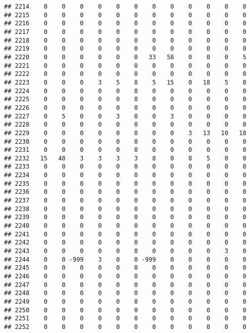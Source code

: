 \documentclass[]{article}
\begin{document}
\begin{verbatim}
## 2214    0    0    0    0    0    0    0    0    0    0    0    0
## 2215    0    0    0    0    0    0    0    0    0    0    0    0
## 2216    0    0    0    0    0    0    0    0    0    0    0    0
## 2217    0    0    0    0    0    0    0    0    0    0    0    0
## 2218    0    0    0    0    0    0    0    0    0    0    0    0
## 2219    0    0    0    0    0    0    0    0    0    0    0    0
## 2220    0    0    0    0    0    0   33   58    0    0    0    5
## 2221    0    0    0    0    0    0    0    0    0    0    0    0
## 2222    0    0    0    0    0    0    0    0    0    0    0    0
## 2223    0    0    0    3    5    8    5   15    0   18    5    0
## 2224    0    0    0    0    0    0    0    0    0    0    0    0
## 2225    0    0    0    0    0    0    0    0    0    0    0    0
## 2226    0    0    0    0    0    0    0    0    0    0    0    0
## 2227    0    5    0    0    3    0    0    3    0    0    0    0
## 2228    0    0    0    0    0    0    0    0    0    0    0    0
## 2229    0    0    0    0    0    0    0    0    3   13   10   18
## 2230    0    0    0    0    0    0    0    0    0    0    0    0
## 2231    0    0    0    0    0    0    0    0    0    0    0    0
## 2232   15   48    3    3    3    3    8    0    8    5    0    0
## 2233    0    0    0    0    0    0    0    0    0    0    0    0
## 2234    0    0    0    0    0    0    0    0    0    0    0    0
## 2235    0    0    0    0    0    0    0    0    0    0    0    0
## 2236    0    0    0    0    0    0    0    0    0    0    0    0
## 2237    0    0    0    0    0    0    0    0    0    0    0    0
## 2238    0    0    0    0    0    0    0    0    0    0    0    0
## 2239    0    0    0    0    0    0    0    0    0    0    0    0
## 2240    0    0    0    0    0    0    0    0    0    0    0    0
## 2241    0    0    0    0    0    0    0    0    0    0    0    0
## 2242    0    0    0    0    0    0    0    0    0    0    0    0
## 2243    0    0    0    0    0    0    0    0    0    0    3    0
## 2244    0    0 -999    3    0    0 -999    0    0    0    0    0
## 2245    0    0    0    0    0    0    0    0    0    0    0    0
## 2246    0    0    0    0    0    0    0    0    0    0    0    0
## 2247    0    0    0    0    0    0    0    0    0    0    0    0
## 2248    0    0    0    0    0    0    0    0    0    0    0    0
## 2249    0    0    0    0    0    0    0    0    0    0    0    0
## 2250    0    0    0    0    0    0    0    0    0    0    0    0
## 2251    0    0    0    0    0    0    0    0    0    0    0    0
## 2252    0    0    0    0    0    0    0    0    0    0    0    0

\end{verbatim}
\end{document}

